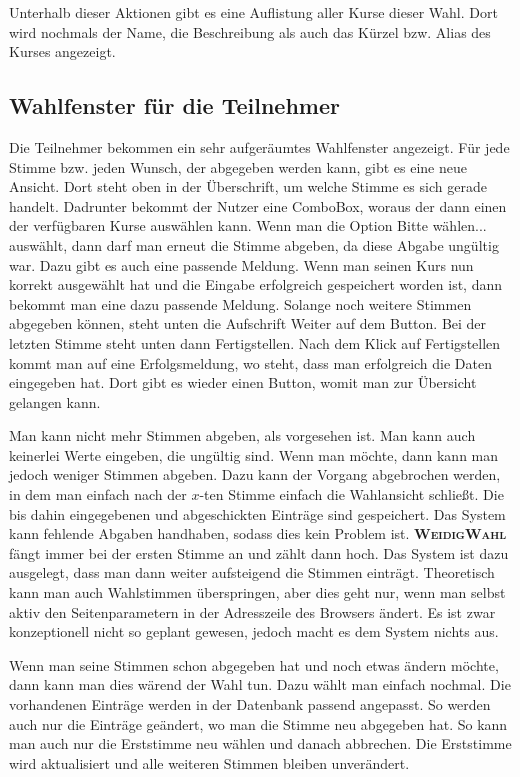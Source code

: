 \documentclass[ngerman]{ltxdoc}
\newcommand{\name}{\textbf{\textsc{WeidigWahl}}\xspace}
\begin{document}
Unterhalb dieser Aktionen gibt es eine Auflistung aller Kurse dieser Wahl. Dort
wird nochmals der Name, die Beschreibung als auch das Kürzel bzw. Alias des Kurses
angezeigt.

\subsection{Wahlfenster für die Teilnehmer}

Die Teilnehmer bekommen ein sehr aufgeräumtes Wahlfenster angezeigt. Für jede
Stimme bzw. jeden Wunsch, der abgegeben werden kann, gibt es eine neue Ansicht.
Dort steht oben in der Überschrift, um welche Stimme es sich gerade handelt.
Dadrunter bekommt der Nutzer eine ComboBox, woraus der dann einen der verfügbaren
Kurse auswählen kann. Wenn man die Option \glqq Bitte wählen...\grqq{} auswählt,
dann darf man erneut die Stimme abgeben, da diese Abgabe ungültig war. Dazu
gibt es auch eine passende Meldung. Wenn man seinen Kurs nun korrekt ausgewählt
hat und die Eingabe erfolgreich gespeichert worden ist, dann bekommt man eine
dazu passende Meldung. Solange noch weitere Stimmen abgegeben können, steht unten
die Aufschrift \glqq Weiter\grqq{} auf dem Button. Bei der letzten Stimme steht
unten dann \glqq Fertigstellen\grqq{}. Nach dem Klick auf Fertigstellen kommt man
auf eine Erfolgsmeldung, wo steht, dass man erfolgreich die Daten eingegeben hat.
Dort gibt es wieder einen Button, womit man zur Übersicht gelangen kann.

Man kann nicht mehr Stimmen abgeben, als vorgesehen ist. Man kann auch keinerlei
Werte eingeben, die ungültig sind. Wenn man möchte, dann kann man jedoch weniger
Stimmen abgeben. Dazu kann der Vorgang abgebrochen werden, in dem man einfach
nach der $x$-ten Stimme einfach die Wahlansicht schließt. Die bis dahin eingegebenen
und abgeschickten Einträge sind gespeichert. Das System kann fehlende Abgaben
handhaben, sodass dies kein Problem ist. \name fängt immer bei der ersten Stimme
an und zählt dann hoch. Das System ist dazu ausgelegt, dass man dann weiter
aufsteigend die Stimmen einträgt. Theoretisch kann man auch Wahlstimmen überspringen,
aber dies geht nur, wenn man selbst aktiv den Seitenparametern in der Adresszeile
des Browsers ändert. Es ist zwar konzeptionell nicht so geplant gewesen, jedoch
macht es dem System nichts aus.

Wenn man seine Stimmen schon abgegeben hat und noch etwas ändern möchte, dann kann
man dies wärend der Wahl tun. Dazu wählt man einfach nochmal. Die vorhandenen
Einträge werden in der Datenbank passend angepasst. So werden auch nur die Einträge
geändert, wo man die Stimme neu abgegeben hat. So kann man auch nur die Erststimme
neu wählen und danach abbrechen. Die Erststimme wird aktualisiert und alle weiteren
Stimmen bleiben unverändert.
\end{document}
